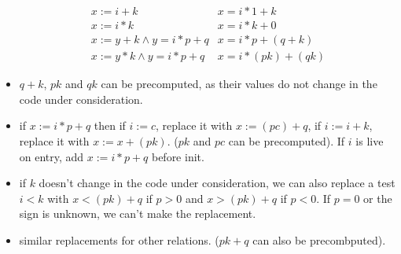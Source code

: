 \begin{itemize}
\begin{align}
x:=i+k & x = i*1 + k \\
x:=i*k & x = i*k + 0 \\
x:=y+k \wedge y=i*p+q & x = i*p+(q+k) \\
x:=y*k \wedge y=i*p+q & x = i*(pk)+(qk)
\end{align}

\item $q+k$, $pk$ and $qk$ can be precomputed, as their values do not change in
the code under consideration.

\item if $x:=i*p+q$ then if $i:=c$, replace it with $x:=(pc)+q$, if $i:=i+k$,
replace it with $x:=x+(pk)$. ($pk$ and $pc$ can be precomputed). If $i$ is live
on entry, add $x:=i*p+q$ before init.

\item if $k$ doesn't change in the code under consideration, we can also
replace a test $i<k$ with $x<(pk)+q$ if $p>0$ and $x>(pk)+q$ if $p<0$. If $p=0$
or the sign is unknown, we can't make the replacement.

\item similar replacements for other relations. ($pk+q$ can also be precombputed).

\end{itemize}
